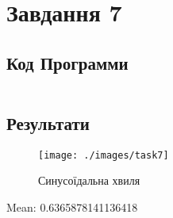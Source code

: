 \section{Завдання 7}
\label{sec:task7}

\subsection{Код Программи}
\label{subsec:task7_code}
\inputminted{python}{../src/task7.py}

\subsection{Результати}
\label{subsec:task7_results}

\begin{figure}[!ht]
    \centering
    \texttt{[image: ./images/task7]}
    \caption{Синусоїдальна хвиля}
    \label{fig:sine_wave}
\end{figure}

Mean: 0.6365878141136418
